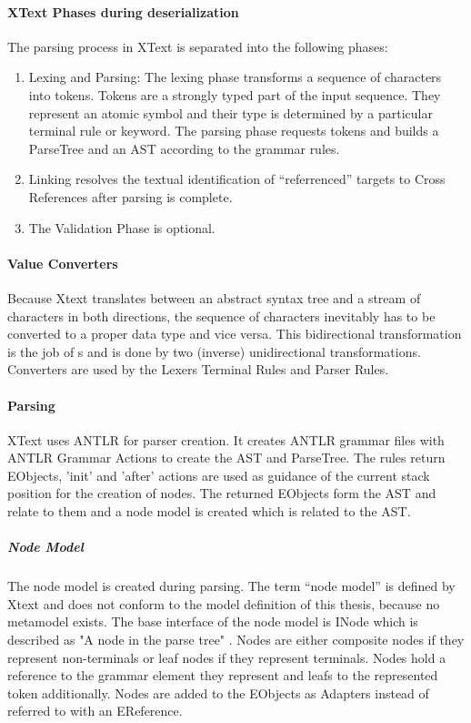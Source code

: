 \paragraph{XText Phases during deserialization}
The parsing process in XText is separated into the following phases:
\begin{enumerate}
	\item Lexing and Parsing: The lexing phase transforms a sequence of characters into tokens. Tokens are a strongly typed part of the input sequence. They represent an atomic symbol and their type is determined by a particular terminal rule or keyword. The parsing phase requests tokens and builds a ParseTree and an AST according to the grammar rules.
	\item Linking resolves the textual identification of ``referrenced'' targets to Cross References after parsing is complete.
	\item The Validation Phase is optional.
\end{enumerate}

\paragraph{Value Converters}
Because Xtext translates between an abstract syntax tree and a stream of characters in both directions, the sequence of characters inevitably has to be converted to a proper data type and vice versa. This bidirectional transformation is the job of s and is done by two (inverse) unidirectional transformations. Converters are used by the Lexers Terminal Rules and Parser Rules.


\paragraph{Parsing}
XText uses ANTLR \cite{ANTLR} for parser creation. It creates ANTLR grammar files with ANTLR Grammar Actions to create the AST and ParseTree. The rules return EObjects, 'init' and 'after' actions are used as guidance of the current stack position for the creation of nodes. The returned EObjects form the AST and relate to them and a node model is created which is related to the AST. 

\subparagraph{Node Model}
The node model is created during parsing. The term ``node model'' is defined by Xtext and does not conform to the model definition of this thesis, because no metamodel exists. The base interface of the node model is INode which  is described as "A node in the parse tree" \cite{XTextAPI}. Nodes are either composite nodes if they represent non-terminals or leaf nodes if they represent terminals. Nodes hold a reference to the grammar element they represent and leafs to the represented token additionally. Nodes are added to the EObjects as Adapters instead of referred to with an EReference.

